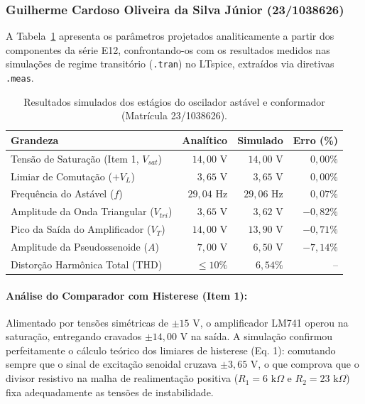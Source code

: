 \documentclass[11pt,a4paper]{article}
\begin{document}

\subsubsection{Guilherme Cardoso Oliveira da Silva Júnior (23/1038626)}

A Tabela~\ref{tab:resultados_cardoso} apresenta os parâmetros projetados analiticamente a partir dos componentes da série E12, confrontando-os com os resultados medidos nas simulações de regime transitório (\texttt{.tran}) no LTspice, extraídos via diretivas \texttt{.meas}.

\begin{table}[H]
    \centering
    \caption{Resultados simulados dos estágios do oscilador astável e conformador (Matrícula 23/1038626).}
    \label{tab:resultados_cardoso}
    \renewcommand{\arraystretch}{1.2}
    \begin{tabular}{@{}lrrr@{}}
    \toprule
    \textbf{Grandeza} & \textbf{Analítico} & \textbf{Simulado} & \textbf{Erro (\%)} \\
    \midrule    
    Tensão de Saturação (Item 1, $V_{sat}$) & $14{,}00\text{ V}$ & $14{,}00\text{ V}$ & $0{,}00\%$ \\
    Limiar de Comutação ($+V_L$) & $3{,}65\text{ V}$ & $3{,}65\text{ V}$ & $0{,}00\%$ \\
    Frequência do Astável ($f$) & $29{,}04\text{ Hz}$ & $29{,}06\text{ Hz}$ & $0{,}07\%$ \\
    Amplitude da Onda Triangular ($V_{tri}$) & $3{,}65\text{ V}$ & $3{,}62\text{ V}$ & $-0{,}82\%$ \\
    Pico da Saída do Amplificador ($V_T$) & $14{,}00\text{ V}$ & $13{,}90\text{ V}$ & $-0{,}71\%$ \\
    Amplitude da Pseudossenoide ($A$) & $7{,}00\text{ V}$ & $6{,}50\text{ V}$ & $-7{,}14\%$ \\
    Distorção Harmônica Total (THD) & $\le 10\%$ & $6{,}54\%$ & -- \\
    \bottomrule
    \end{tabular}
\end{table}

\paragraph{Análise do Comparador com Histerese (Item 1):}
Alimentado por tensões simétricas de $\pm15\text{ V}$, o amplificador LM741 operou na saturação, entregando cravados $\pm14{,}00\text{ V}$ na saída. A simulação confirmou perfeitamente o cálculo teórico dos limiares de histerese (Eq. 1): comutando sempre que o sinal de excitação senoidal cruzava $\pm 3{,}65\text{ V}$, o que comprova que o divisor resistivo na malha de realimentação positiva ($R_1 = 6\text{ k}\Omega$ e $R_2 = 23\text{ k}\Omega$) fixa adequadamente as tensões de instabilidade.
\end{document}
